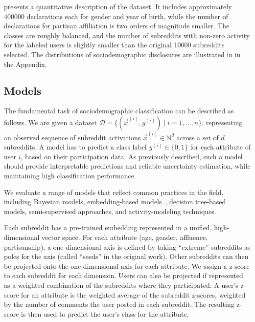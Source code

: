  presents a quantitative description of the dataset.
It includes approximately \num{400000} declarations each for gender and year of birth, while the number of declarations for partisan affiliation is two orders of magnitude smaller.
The classes are roughly balanced, and the number of subreddits with non-zero activity for the labeled users is slightly smaller than the original \num{10000} subreddits selected.
The distributions of sociodemographic disclosures are illustrated in  in the Appendix.

\subsection{Models}
The fundamental task of sociodemographic classification can be described as follows.
We are given a dataset \(\mathcal{D} = \{(\vec{x}^{(i)}, y^{(i)}) \mid i = 1, \dots, n\}\), representing an observed sequence of subreddit activations \(\vec{x}^{(i)} \in \mathbb{N}^d\) across a set of \(d\) subreddits.
A model has to predict a class label \(y^{(i)} \in \{0, 1\}\) for each attribute of user \(i\), based on their participation data.
As previously described, such a model should provide interpretable predictions and reliable uncertainty estimation, while maintaining high classification performance.

We evaluate a range of models that reflect common practices in the field, including Bayesian models, embedding-based models~\citep{waller2021quantifying}, decision tree-based models, semi-supervised approaches, and activity-modeling techniques.



Each subreddit has a pre-trained embedding represented in a unified, high-dimensional vector space.
For each attribute (age, gender, affluence, partisanship), a one-dimensional axis is defined by taking ``extreme'' subreddits as poles for the axis (called ``seeds'' in the original work).
Other subreddits can then be projected onto the one-dimensional axis for each attribute.
We assign a z-score to each subreddit for each dimension.
Users can also be projected if represented as a weighted combination of the subreddits where they participated.
A user's z-score for an attribute is the weighted average of the subreddit z-scores, weighted by the number of comments the user posted in each subreddit.
The resulting z-score is then used to predict the user's class for the attribute.

